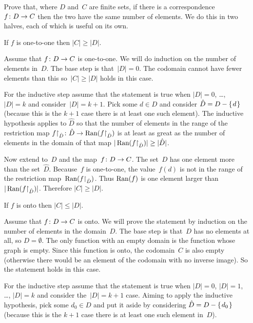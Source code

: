 \documentclass{ibl}  %
\begin{document}
\begin{problem}   \label{CorrespondingSetsHaveSameNumberOfElements}
  Prove that, 
  where $D$ and~$C$ are finite sets, 
  if there is a correspondence~$\mbox{$f\colon D\to C$}$
  then the two have the same number of elements.
  We do this in two halves, each of which is useful on its own.
\begin{exes}
\begin{exercise} 
  If $f$ is one-to-one then $|C|\geq |D|$.
\end{exercise}
\begin{answer}
  Assume that $\mbox{$f\colon D\to C$}$ is one-to-one.
  We will do induction on the number of elements in~$D$.
  The base step is that~$|D|=0$.
  The codomain cannot have fewer elements than this
  so~$|C|\geq |D|$ holds in this case.

  For the inductive step assume that the statement is true when $|D|=0$, 
  \ldots, $|D|=k$ and consider~$|D|=k+1$.
  Pick some $d\in D$ and consider 
  $\hat{D}=D-\mbox{$\{\hspace{0.1em}d\hspace{0.1em}\}$}$ (because this is the $k+1$ case there is at least
  one such element).
  The inductive hypothesis applies to $\hat{D}$ so that 
  the number of elements in the range of the restriction map 
  $\mbox{${f}\mathord\upharpoonright_{\hat{D}}\colon \hat{D}\to \operatorname{Ran}({f}\mathord\upharpoonright_{\hat{D}})$}$
  is at least as great as the number of elements in the domain of that map
  $|\operatorname{Ran}({f}\mathord\upharpoonright_{\hat{D}})|\geq |\hat{D}|$.

  Now extend to~$D$ and the map~$\mbox{$f\colon D\to C$}$.
  The set~$D$ has one element more than the set~$\hat{D}$.
  Because~$f$ is one-to-one, the value~$f(d)$ is not in 
  the range of the restriction map~$\operatorname{Ran}({f}\mathord\upharpoonright_{\hat{D}})$.
  Thus $\operatorname{Ran}(f)$ is one element larger than
  $|\operatorname{Ran}({f}\mathord\upharpoonright_{\hat{D}})|$.
  Therefore $|C|\geq|D|$.  
\end{answer}
\begin{exercise}
  If $f$ is onto then $|C|\leq |D|$.
\end{exercise}
\begin{answer}
  Assume that $\mbox{$f\colon D\to C$}$ is onto.
  We will prove the statement by induction on the number of elements in
  the domain~$D$.
  The base step is that~$D$ has no elements at all, so $D=\emptyset$.
  The only function with an empty domain is the function whose graph is 
  empty. 
  Since this function is onto, the codomain~$C$ is also empty 
  (otherwise there would be an element of the codomain with no inverse
  image).
  So the statement holds in this case.

  For the inductive step assume that the statement is true when $|D|=0$, 
  $|D|=1$, \ldots, $|D|=k$ and consider the~$|D|=k+1$ case.
  Aiming to apply the inductive hypothesis, 
  pick some $d_0\in D$ and put it aside by considering 
  $\hat{D}=D-\mbox{$\{\hspace{0.1em}d_0\hspace{0.1em}\}$}$ (because this is the $k+1$ case there is at least
  one such element in~$D$).


\end{answer}
\end{exes}
\end{problem}
\end{document}
